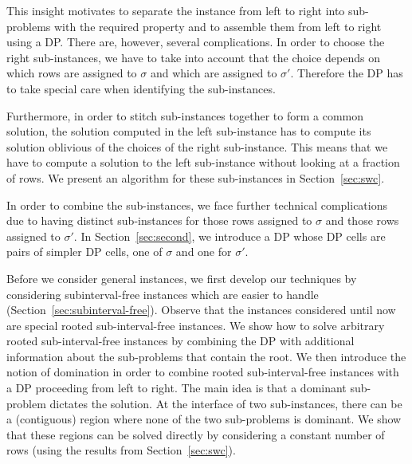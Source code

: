 This insight motivates to separate the instance from left to right into sub-problems with the required property and to assemble them from left to right using a DP.
There are, however, several complications.
In order to choose the right sub-instances, we have to take into account that the choice depends on which rows are assigned to $\sigma$ and which are assigned to $\sigma'$.
Therefore the DP has to take special care when identifying the sub-instances.

Furthermore, in order to stitch sub-instances together to form a common solution, the solution computed in the left sub-instance has to compute its solution oblivious of the choices of the right sub-instance.
This means that we have to compute a solution to the left sub-instance without looking at a fraction of rows.
We present an algorithm for these sub-instances in Section~\ref{sec:swc}.

In order to combine the sub-instances, we face further technical complications due to having distinct sub-instances for those rows assigned to $\sigma$ and those rows assigned to $\sigma'$.
In Section~\ref{sec:second}, we introduce a DP whose DP cells are pairs of simpler DP cells, one of $\sigma$ and one for $\sigma'$.

Before we consider general instances, we first develop our techniques by considering subinterval-free instances which are easier to handle (Section~\ref{sec:subinterval-free}).
Observe that the instances considered until now are special rooted sub-interval-free instances.
We show how to solve arbitrary rooted sub-interval-free instances by combining the DP with additional information about the sub-problems that contain the root.
We then introduce the notion of domination in order to combine rooted sub-interval-free instances with a DP proceeding from left to right.
The main idea is that a dominant sub-problem dictates the solution.
At the interface of two sub-instances, there can be a (contiguous) region where none of the two sub-problems is dominant.
We show that these regions can be solved directly by considering a constant number of rows (using the results from Section~\ref{sec:swc}).

